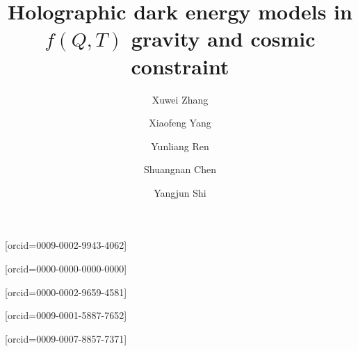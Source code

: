 \documentclass[a4paper,fleqn]{cas-sc}
\begin{document}
\let\WriteBookmarks\relax
\def\floatpagepagefraction{1}
\def\textpagefraction{.001}



\title [mode = title]{Holographic dark energy models in {$f(Q,T)$} gravity and cosmic constraint}  



%

\author[1,2]{Xuwei Zhang}[orcid=0009-0002-9943-4062]




\author[1,2]{Xiaofeng Yang}[orcid=0000-0000-0000-0000]
\cormark[1]

\author[1,3]{Yunliang Ren}[orcid=0000-0002-9659-4581]

\author[1,3]{Shuangnan Chen}[orcid=0009-0001-5887-7652]

\author[1,4]{Yangjun Shi}[orcid=0009-0007-8857-7371]
\end{document}
